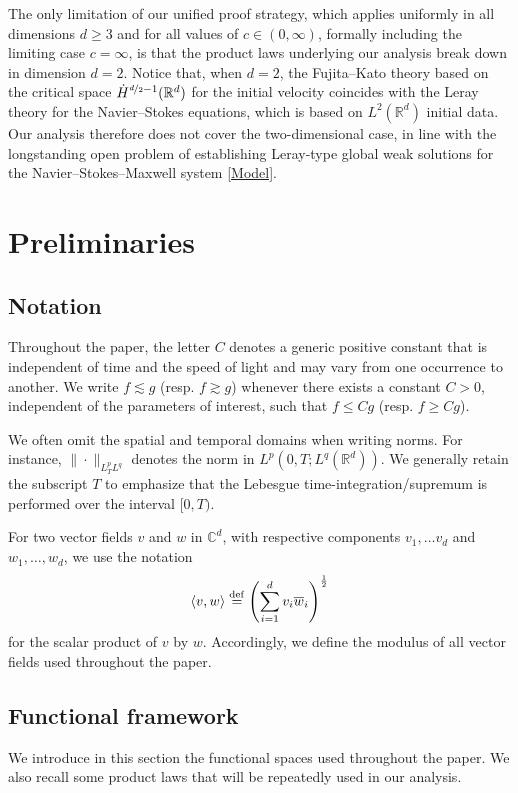 \documentclass[11pt, leqno, a4paper,]{amsart}
\newcommand{\R}{\mathbb{R}}
\theoremstyle{remark}
\numberwithin{equation}{section}
\newcommand*{\bydef}{\overset{\rm def}{=}}
\begin{document}
The only limitation of our unified proof strategy, which applies uniformly in all dimensions $d\geq 3$ and for all values of $c\in(0,\infty)$, formally including the limiting case $c=\infty$, is that the product laws underlying our analysis break down in dimension $d=2$. Notice that, when $d=2$, the Fujita--Kato theory based on the critical space $\dot H^{\nicefrac d2-1}(\mathbb R^d)$ for the initial velocity coincides with the Leray theory for the Navier--Stokes equations, which is based on $L^2(\mathbb R^d)$ initial data. Our analysis therefore does not cover the two-dimensional case, in line with the longstanding open problem of establishing Leray-type global weak solutions for the Navier--Stokes--Maxwell system  \eqref{Model}. 



 


 \section{Preliminaries}\label{Section_Prel} 

\subsection{Notation}
Throughout the paper, the letter $C$ denotes a generic positive constant that is independent of time and the speed of light and may vary from one occurrence to another. We write $f\lesssim g$ (resp. $f\gtrsim g$) whenever there exists a constant $C>0$, independent of the parameters of interest, such that $f\leq Cg$ (resp. $f\geq Cg$).

We often omit the spatial and temporal domains when writing norms. For instance, $\|\cdot\|_{L^p_T L^q}$ denotes the norm in $L^p(0,T;L^q(\R^d))$. We generally retain the subscript $T$ to emphasize that the Lebesgue time-integration/supremum is performed over the interval $[0,T)$.

For two vector fields $v$ and $w$ in $\mathbb C^d$, with respective components $v_1,\dots v_d$ and $w_1,\dots ,w_d$, we use the notation 
\begin{equation*}
	\left\langle v, w\right\rangle \bydef \left ( \sum _{i=1}^d v_i \overline w _i \right )^\frac{1}{2}
\end{equation*}
for the scalar product of $v$ by $w$.  Accordingly, we define the modulus of all vector fields used throughout the paper.



\subsection{Functional framework}We introduce in this section the functional spaces used throughout the paper. We also recall some product laws that will be repeatedly used in our analysis.
\end{document}
